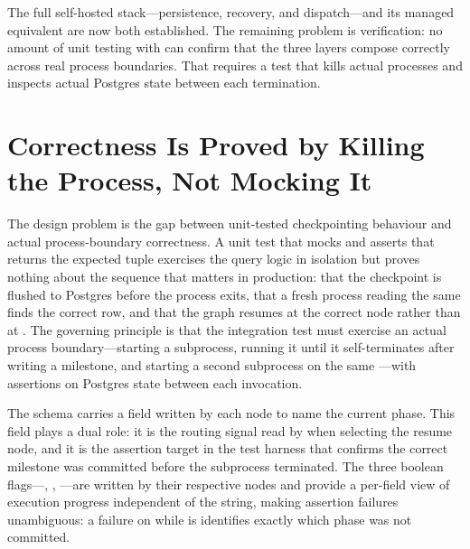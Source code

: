 The full self-hosted stack---persistence, recovery, and dispatch---and its
managed equivalent are now both established. The remaining problem is
verification: no amount of unit testing with  can
confirm that the three layers compose correctly across real process
boundaries. That requires a test that kills actual processes and inspects
actual Postgres state between each termination.


\section{Correctness Is Proved by Killing the Process, Not Mocking It}
\label{sec:durable-full}

The design problem is the gap between unit-tested checkpointing behaviour
and actual process-boundary correctness. A unit test that mocks
 and asserts that  returns
the expected tuple exercises the query logic in isolation but proves
nothing about the sequence that matters in production: that the checkpoint
is flushed to Postgres before the process exits, that a fresh process
reading the same  finds the correct row, and that the
graph resumes at the correct node rather than at . The
governing principle is that the integration test must exercise an actual
process boundary---starting a subprocess, running it until it
self-terminates after writing a milestone, and starting a second subprocess
on the same ---with assertions on Postgres state between
each invocation.

The  schema carries a  field
written by each node to name the current phase. This field plays a dual
role: it is the routing signal read by 
when selecting the resume node, and it is the assertion target in the
test harness that confirms the correct milestone was committed before the
subprocess terminated. The three boolean flags---,
, ---are written by their respective
nodes and provide a per-field view of execution progress independent of
the  string, making assertion failures unambiguous: a failure
on  while  is 
identifies exactly which phase was not committed.

